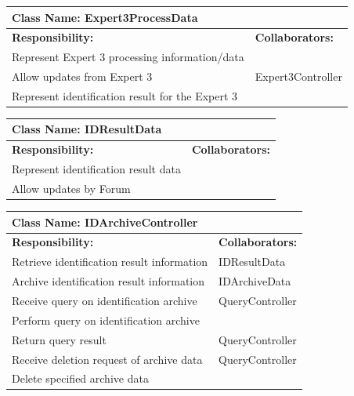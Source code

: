 \documentclass[]{article}
\begin{document}
	\begin{table}[ht]
		\centering
		\begin{tabular}{|p{5cm}|p{5cm}|}
		\hline 
		 \multicolumn{2}{|l|}{\textbf{Class Name: Expert3ProcessData}} \\
		\hline
		\textbf{Responsibility:} & \textbf{Collaborators:} \\
		\hline
		Represent Expert 3 processing information/data &  \\
		\hline
		Allow updates from Expert 3 & Expert3Controller \\
		\hline
		Represent identification result for the Expert 3 &  \\
		\hline
		\end{tabular}
	\end{table}
	
	\begin{table}[ht]
		\centering
		\begin{tabular}{|p{5cm}|p{5cm}|}
		\hline 
		 \multicolumn{2}{|l|}{\textbf{Class Name: IDResultData}} \\
		\hline
		\textbf{Responsibility:} & \textbf{Collaborators:} \\
		\hline
		Represent identification result data &  \\
		\hline
		Allow updates by Forum &  \\
		\hline
		\end{tabular}
	\end{table}
	
\newpage
	\begin{table}[ht]
		\centering
		\begin{tabular}{|p{5cm}|p{5cm}|}
		\hline 
		 \multicolumn{2}{|l|}{\textbf{Class Name: IDArchiveController}} \\
		\hline
		\textbf{Responsibility:} & \textbf{Collaborators:} \\
		\hline
		Retrieve identification result information & IDResultData \\
		\hline
		Archive identification result information & IDArchiveData \\
		\hline
		Receive query on identification archive & QueryController \\
		\hline
		Perform query on identification archive &  \\
		\hline
		Return query result & QueryController \\
		\hline
		Receive deletion request of archive data & QueryController \\
		\hline
		Delete specified archive data &  \\
		\hline
		\end{tabular}
	\end{table}
	
\end{document}
